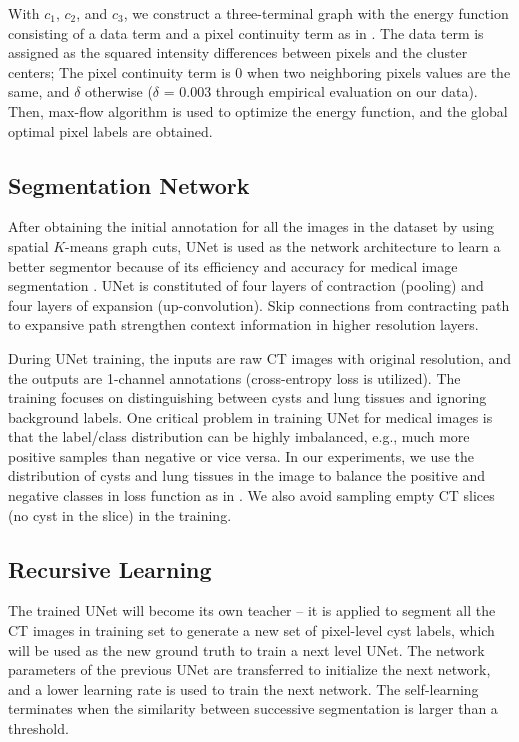 \documentclass{article}
\begin{document}
With $c_{1}$, $c_{2}$, and $c_{3}$, we construct a three-terminal graph with the energy function consisting of a data term and a pixel continuity term as in \cite{boykov2004experimental}. The data term is assigned as the squared intensity differences between pixels and the cluster centers; The pixel continuity term is 0 when two neighboring pixels values are the same, and $\delta$ otherwise ($\delta$ = 0.003 through empirical evaluation on our data). Then, max-flow algorithm \cite{boykov2004experimental} is used to optimize the energy function, and the global optimal pixel labels are obtained.

\subsection{Segmentation Network}
After obtaining the initial annotation for all the images in the dataset by using spatial $K$-means graph cuts, UNet is used as the network architecture to learn a better segmentor because of its efficiency and accuracy for medical image segmentation \cite{ronneberger2015u}. %
UNet is constituted of four layers of contraction (pooling) and four layers of expansion (up-convolution). Skip connections from contracting path to expansive path strengthen context information in higher resolution layers.

During UNet training, the inputs are raw CT images with original resolution, and the outputs are 1-channel annotations (cross-entropy loss is utilized). The training focuses on distinguishing between cysts and lung tissues and ignoring background labels. One critical problem in training UNet for medical images is that the label/class distribution can be highly imbalanced, e.g., much more positive samples than negative or vice versa. In our experiments, we use the distribution of cysts and lung tissues in the image to balance the positive and negative classes in loss function as in \cite{xie2015holistically}. We also avoid sampling empty CT slices (no cyst in the slice) in the training.

\subsection{Recursive Learning}
The trained UNet will become its own teacher -- it is applied to segment all the CT images in training set to generate a new set of pixel-level cyst labels, which will be used as the new ground truth to train a next level UNet. The network parameters of the previous UNet are transferred to initialize the next network, and a lower learning rate is used to train the next network. 
The self-learning terminates when the similarity between successive segmentation is larger than a threshold. 
\end{document}

